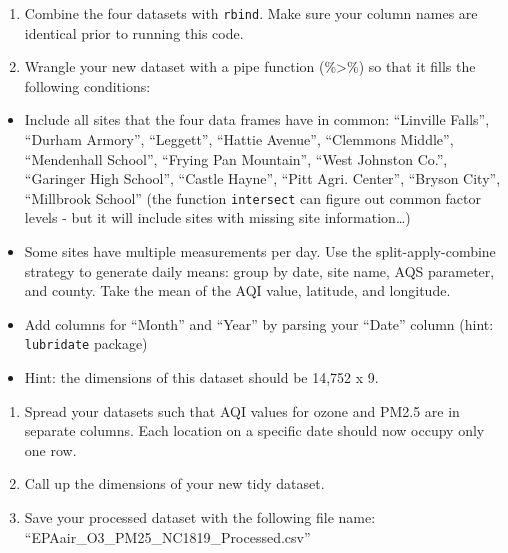 \documentclass[
]{article}
\begin{document}
\begin{enumerate}
\def\labelenumi{\arabic{enumi}.}
\setcounter{enumi}{6}
\item
  Combine the four datasets with \texttt{rbind}. Make sure your column
  names are identical prior to running this code.
\item
  Wrangle your new dataset with a pipe function (\%\textgreater\%) so
  that it fills the following conditions:
\end{enumerate}

\begin{itemize}
\item
  Include all sites that the four data frames have in common: ``Linville
  Falls'', ``Durham Armory'', ``Leggett'', ``Hattie Avenue'', ``Clemmons
  Middle'', ``Mendenhall School'', ``Frying Pan Mountain'', ``West
  Johnston Co.'', ``Garinger High School'', ``Castle Hayne'', ``Pitt
  Agri. Center'', ``Bryson City'', ``Millbrook School'' (the function
  \texttt{intersect} can figure out common factor levels - but it will
  include sites with missing site information\ldots)
\item
  Some sites have multiple measurements per day. Use the
  split-apply-combine strategy to generate daily means: group by date,
  site name, AQS parameter, and county. Take the mean of the AQI value,
  latitude, and longitude.
\item
  Add columns for ``Month'' and ``Year'' by parsing your ``Date'' column
  (hint: \texttt{lubridate} package)
\item
  Hint: the dimensions of this dataset should be 14,752 x 9.
\end{itemize}

\begin{enumerate}
\def\labelenumi{\arabic{enumi}.}
\setcounter{enumi}{8}
\item
  Spread your datasets such that AQI values for ozone and PM2.5 are in
  separate columns. Each location on a specific date should now occupy
  only one row.
\item
  Call up the dimensions of your new tidy dataset.
\item
  Save your processed dataset with the following file name:
  ``EPAair\_O3\_PM25\_NC1819\_Processed.csv''
\end{enumerate}
\end{document}
